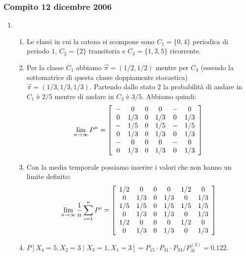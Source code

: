\documentclass{article}
\begin{document}
\subsubsection{Compito 12 dicembre 2006}
\begin{enumerate}
    \item\begin{enumerate}[label=\alph*)]
        \item Le classi in cui la catena si scompone sono $C_1 = \{0,4\}$ periodica di periodo $1$, $C_2 = \{2\}$ transitoria e $C_3=\{1,3,5\}$ ricorrente.
        \item Per la classe $C_1$ abbiamo $\vec{\pi} = (1/2,1/2)$ mentre per $C_3$ (essendo la sottomatrice di questa classe doppiamente stocastica) $\vec{\pi} = (1/3,1/3,1/3)$. Partendo dallo stato $2$ la probabilità di andare in $C_1$ è $2/5$ mentre di andare in $C_3$ è $3/5$. Abbiamo quindi:
        \begin{align*}
        \lim_{n\to\infty} P^n = \left[\begin{array}{c c c c c c}
        - & 0& 0& 0& - & 0\\
        0 & 1/3& 0& 1/3& 0 & 1/3\\
        - & 1/5& 0& 1/5& - & 1/5\\
        0 & 1/3& 0& 1/3& 0 & 1/3\\
        - & 0& 0& 0& - & 0\\
        0 & 1/3& 0& 1/3& 0 & 1/3\\
        \end{array}\right]
        \end{align*}
        \item Con la media temporale possiamo inserire i valori che non hanno un limite definito:
        \begin{align*}
        \lim_{n\to\infty}\frac{1}{n}\sum_{i=1}^n P^i = \left[\begin{array}{c c c c c c}
        1/2 & 0& 0& 0& 1/2 & 0\\
        0 & 1/3& 0& 1/3& 0 & 1/3\\
        1/5 & 1/5& 0& 1/5& 1/5 & 1/5\\
        0 & 1/3& 0& 1/3& 0 & 1/3\\
        1/2 & 0& 0& 0& 1/2 & 0\\
        0 & 1/3& 0& 1/3& 0 & 1/3\\
        \end{array}\right]
        \end{align*}
        \item $P[X_4 = 5,X_2 = 3\mid X_3 = 1,X_1=3] = P_{15}\cdot P_{31}\cdot P_{33}/P_{31}^{(2)} = 0.122$.
    \end{enumerate}
    

\end{enumerate}
\end{document}
